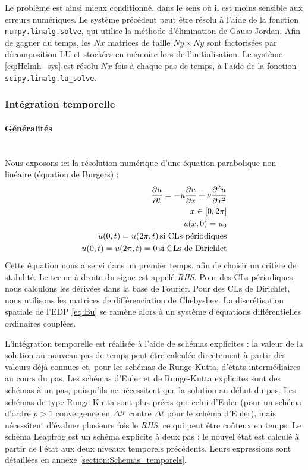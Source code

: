 Le problème est ainsi mieux conditionné, dans le sens où il est moins sensible aux erreurs numériques. Le système précédent peut être résolu à l'aide de la fonction \verb|numpy.linalg.solve|, qui utilise la méthode d'élimination de Gauss-Jordan. Afin de gagner du temps, les $Nx$ matrices de taille $Ny\times Ny$ sont factorisées par décomposition LU et stockées en mémoire lors de l'initialisation. Le système \ref{eq:Helmh_sys} est résolu $Nx$ fois à chaque pas de temps, à l'aide de la fonction \verb|scipy.linalg.lu_solve|. 
\subsubsection{Intégration temporelle}
\paragraph{Généralités}~\\
Nous exposons ici la résolution numérique d'une équation parabolique non-linéaire (équation de Burgers) : 
\begin{align}
	\frac{\partial u}{\partial t} = -u\frac{\partial u}{\partial x}+\nu\frac{\partial^2 u}{\partial x^2}\\
	x\in [0, 2\pi]\\
	u(x, 0) = u_0\\
	u(0, t) = u(2\pi, t)\, \textrm{si CLs périodiques}\\
	u(0, t) = u(2\pi, t) = 0\, \textrm{si CLs de Dirichlet}
	\label{eq:Bu}
\end{align}
Cette équation nous a servi dans un premier temps, afin de choisir un critère de stabilité. Le terme à droite du signe  est appelé \textit{RHS}. Pour des CLs périodiques, nous calculons les dérivées dans la base de Fourier. Pour des CLs de Dirichlet, nous utilisons les matrices de différenciation de Chebyshev. La discrétisation spatiale de l'EDP \ref{eq:Bu} se ramène alors à un système d'équations différentielles ordinaires couplées. 

L'intégration temporelle est réalisée à l'aide de schémas explicites : la valeur de la solution au nouveau pas de temps peut être calculée directement à partir des valeurs déjà connues et, pour les schémas de Runge-Kutta, d'états intermédiaires au cours du pas.
Les schémas d'Euler et de Runge-Kutta explicites sont des schémas à un pas, puisqu'ils ne nécessitent que la solution au début du pas. Les schémas de type Runge-Kutta sont plus précis que celui d'Euler (pour un schéma d'ordre $p > 1 $ convergence en $\Delta t^p$ contre $\Delta t$ pour le schéma d'Euler), mais nécessitent d'évaluer plusieurs fois le \textit{RHS}, ce qui peut être coûteux en temps. Le schéma Leapfrog est un schéma explicite à deux pas : le nouvel état est calculé à partir de l'état aux deux niveaux temporels précédents. Leurs expressions sont détaillées en annexe \ref{section:Schemas_temporels}.
